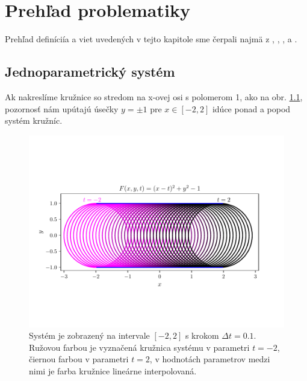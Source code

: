 \chapter{Prehľad problematiky}
\label{kap:kapitola1}
Prehľad definíciía a viet uvedených v tejto kapitole sme čerpali najmä z \cite{Bru92}, \cite{Bru81}, \cite{doCarmo17}, \cite{Ode20} a \cite{Vra22}.

\section{Jednoparametrický systém}
Ak nakreslíme kružnice so stredom na x-ovej osi s polomerom 1, ako na obr. \ref{fig:new_system}, pozornosť nám upútajú úsečky $y = \pm 1$ pre $ x \in [-2,2]$ idúce ponad a popod systém kružníc.


\begin{figure}[h]
	\centering
	\includegraphics[trim={0.5cm 2.5cm 0.5cm 3cm},clip]{images/new_envelope.pdf}
	\caption[Jednoparametrický systém kružníc.]{Systém je zobrazený na intervale $[-2,2]$ s krokom  $\Delta t = 0.1$. Ružovou farbou je vyznačená kružnica systému v parametri $t=-2$, čiernou farbou v parametri $t = 2$, v hodnotách parametrov medzi nimi je farba kružnice lineárne interpolovaná. }
	\label{fig:new_system}
\end{figure}

